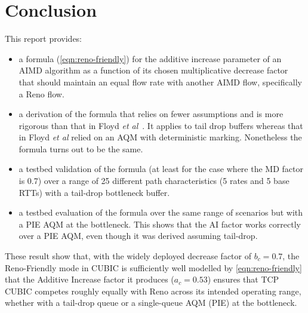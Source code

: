 
\section{Conclusion}\label{Conclusion}

This report provides:
\begin{itemize}[nosep]
	\item a formula (\autoref{eqn:reno-friendly}) for the additive increase parameter of an AIMD algorithm as a function of its chosen multiplicative decrease factor that should maintain an equal flow rate with another AIMD flow, specifically a Reno flow. 
	
	\item a derivation of the formula that relies on fewer assumptions and is more rigorous than that in Floyd \emph{et al}~\cite{Floyd00:Eqn_v_AIMD_cc}. It applies to tail drop buffers whereas that in Floyd \emph{et al} relied on an AQM with deterministic marking. Nonetheless the formula turns out to be the same.
	
	\item a testbed validation of the formula (at least for the case where the MD factor is 0.7) over a range of 25 different path characteristics (5 rates and 5 base RTTs) with a tail-drop bottleneck buffer.
	
	\item a testbed evaluation of the formula over the same range of scenarios but with a PIE AQM at the bottleneck. This shows that the AI factor works correctly over a PIE AQM, even though it was derived assuming tail-drop.
\end{itemize}

These result show that, with the widely deployed decrease factor of \(b_c=0.7\), the Reno-Friendly mode in CUBIC is sufficiently well modelled by \autoref{eqn:reno-friendly} that the Additive Increase factor it produces (\(a_c = 0.53\)) ensures that TCP CUBIC competes roughly equally with Reno across its intended operating range, whether with a tail-drop queue or a single-queue AQM (PIE) at the bottleneck.